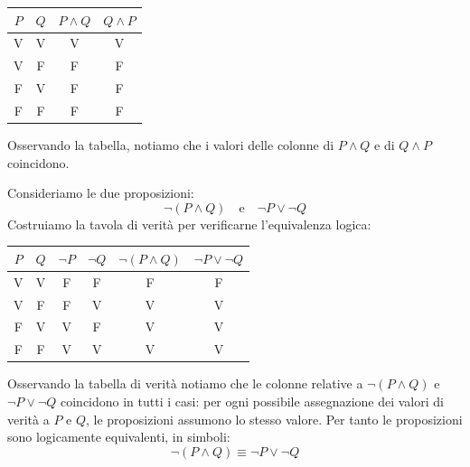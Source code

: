 \begin{center}
\begin{tabular}{c|c|c|c}
  \(P\) & \(Q\) & \(P \land Q\) & \(Q \land P\) \\
  \hline
  V & V & V & V \\
  V & F & F & F \\
  F & V & F & F \\
  F & F & F & F \\
\end{tabular}
\end{center}

Osservando la tabella, notiamo che i valori delle colonne di  \(P \land Q\) e di \(Q \land P\) coincidono.









\begin{esempio} 
    Consideriamo le due proposizioni:
    \[
    \neg(P \land Q) \quad \text{e} \quad \neg P \lor \neg Q
    \]
    Costruiamo la tavola di verità per verificarne l'equivalenza logica:
    \begin{center}
    \begin{tabular}{c|c|c|c|c|c}
      \(P\) & \(Q\) & \(\neg P\) & \(\neg Q\) & \(\neg(P \land Q)\) & \(\neg P \lor \neg Q\) \\
      \hline
      V & V & F & F & F & F \\
      V & F & F & V & V & V \\
      F & V & V & F & V & V \\
      F & F & V & V & V & V \\
    \end{tabular}
    \end{center}



Osservando la tabella di verità notiamo che le colonne relative a \(\neg(P \land Q)\)  e \(\neg P \lor \neg Q\) coincidono in tutti i casi: per ogni possibile assegnazione dei valori di verità a $P$ e $Q$, le proposizioni assumono lo stesso valore. Per tanto le proposizioni sono logicamente equivalenti, in simboli:
\[
\neg(P \land Q) \equiv \neg P \lor \neg Q
\]
\end{esempio}

